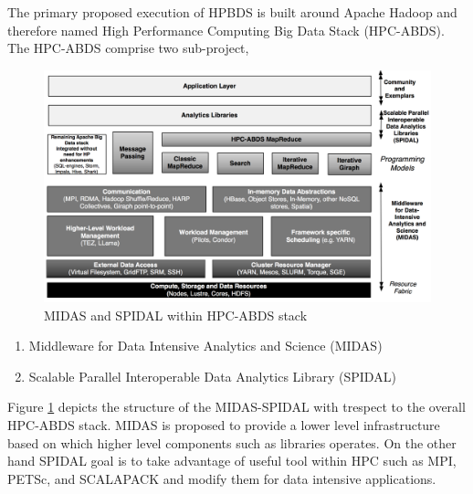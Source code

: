 \documentclass[runningheads,a4paper]{llncs}
\begin{document}
The primary proposed execution of HPBDS is built around Apache Hadoop and therefore named High Performance Computing Big Data Stack (HPC-ABDS). The HPC-ABDS comprise two sub-project,
\begin{figure}[h]
	\includegraphics[scale=0.25]{./images/MIDASSPIDAL.png}
	\centering
	\caption{MIDAS and SPIDAL within HPC-ABDS stack\cite{qiu2014towards}}
	\label{fig:MIDAS_SPIDAL}
\end{figure}
\begin{enumerate}
	\item Middleware for Data Intensive Analytics and Science (MIDAS)
	\item Scalable Parallel Interoperable Data Analytics Library (SPIDAL)  
\end{enumerate}

Figure \ref{fig:MIDAS_SPIDAL} depicts the structure of the MIDAS-SPIDAL with trespect to the overall HPC-ABDS stack. MIDAS is proposed to provide a lower level infrastructure based on which higher level components such as libraries operates. On the other hand SPIDAL goal is to take advantage of useful tool within HPC such as MPI, PETSc, and SCALAPACK and modify them for data intensive applications.\\
\end{document}
